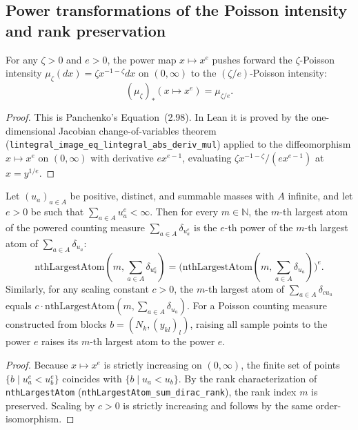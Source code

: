 \subsection*{Power transformations of the Poisson intensity and rank preservation}

\begin{theorem}\label{thm:sg:zeta-power}
  \leanok
For any $\zeta > 0$ and $e > 0$, the power map $x \mapsto x^e$ pushes forward the $\zeta$-Poisson intensity $\mu_\zeta(dx) = \zeta x^{-1-\zeta} dx$ on $(0, \infty)$ to the $(\zeta / e)$-Poisson intensity:
\[
 (\mu_\zeta)_*(x \mapsto x^e) = \mu_{\zeta / e} .
\]
\end{theorem}
\begin{proof}
  \leanok
This is Panchenko's Equation~(2.98). In Lean it is proved by the one-dimensional Jacobian change-of-variables theorem (\texttt{lintegral\_image\_eq\_lintegral\_abs\_deriv\_mul}) applied to the diffeomorphism $x \mapsto x^e$ on $(0, \infty)$ with derivative $e x^{e-1}$, evaluating $\zeta x^{-1-\zeta} / (e x^{e-1})$ at $x = y^{1/e}$.
\end{proof}

\begin{theorem}\label{thm:sg:ranked-powers}
  \leanok
Let $(u_a)_{a \in A}$ be positive, distinct, and summable masses with $A$ infinite, and let $e > 0$ be such that $\sum_{a \in A} u_a^e < \infty$.
Then for every $m \in \mathbb N$, the $m$-th largest atom of the powered counting measure $\sum_{a \in A} \delta_{u_a^e}$ is the $e$-th power of the $m$-th largest atom of $\sum_{a \in A} \delta_{u_a}$:
\[
 \mathrm{nthLargestAtom}(m, \sum_{a \in A} \delta_{u_a^e}) = \big(\mathrm{nthLargestAtom}(m, \sum_{a \in A} \delta_{u_a})\big)^e .
\]
Similarly, for any scaling constant $c > 0$, the $m$-th largest atom of $\sum_{a \in A} \delta_{c u_a}$ equals $c \cdot \mathrm{nthLargestAtom}(m, \sum_{a \in A} \delta_{u_a})$.
For a Poisson counting measure constructed from blocks $b = (N_k, (y_{kl})_l)$, raising all sample points to the power $e$ raises its $m$-th largest atom to the power $e$.
\end{theorem}
\begin{proof}
  \leanok
Because $x \mapsto x^e$ is strictly increasing on $(0, \infty)$, the finite set of points $\{b \mid u_a^e < u_b^e\}$ coincides with $\{b \mid u_a < u_b\}$. By the rank characterization of \texttt{nthLargestAtom} (\texttt{nthLargestAtom\_sum\_dirac\_rank}), the rank index $m$ is preserved. Scaling by $c > 0$ is strictly increasing and follows by the same order-isomorphism.
\end{proof}


